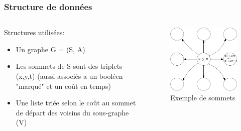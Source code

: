 \documentclass{beamer}
\begin{document}
\begin{frame}\frametitle{Structure de données}
\begin{columns}

	\begin{column}{5cm}
	Structures utilisées:
	\begin{itemize}
	\item Un graphe G = (S, A)
	\item Les sommets de S sont des triplets (x,y,t) (aussi associés a un booléen "marqué" et un coût en temps)
	\item Une liste triée selon le coût au sommet de départ des voisins du sous-graphe (V)
	\end{itemize}
	\end{column}
	
	\begin{column}{5cm}
	\begin{figure}
	\includegraphics[scale=0.3]{graphe.png} 
	\caption{Exemple de sommets}
	\end{figure}
	\end{column}
	
\end{columns}
\end{frame}
\end{document}
